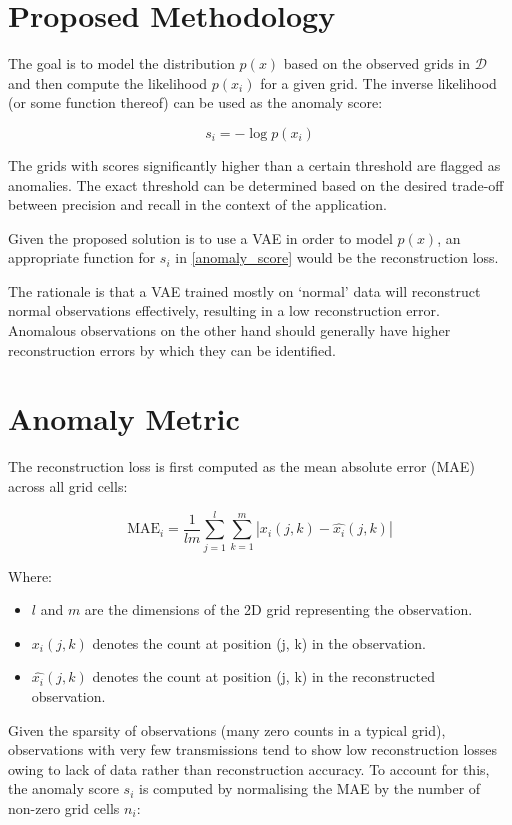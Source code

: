 \documentclass{mldsmsc}
\begin{document}
\section{Proposed Methodology}

The goal is to model the distribution $p(x)$ based on the observed grids in $\mathcal{D}$ and then compute the likelihood $p(x_i)$ for a given grid. The inverse likelihood (or some function thereof) can be used as the anomaly score:

\begin{equation}
	s_i = -\log p(x_i) \label{anomaly_score}
\end{equation}

The grids with scores significantly higher than a certain threshold are flagged as anomalies. The exact threshold can be determined based on the desired trade-off between precision and recall in the context of the application.

Given the proposed solution is to use a VAE in order to model $p(x)$, an appropriate function for $s_i$ in \ref{anomaly_score} would be the reconstruction loss.

The rationale is that a VAE trained mostly on `normal' data will reconstruct normal observations effectively, resulting in a low reconstruction error. Anomalous observations on the other hand should generally have higher reconstruction errors by which they can be identified.

\section{Anomaly Metric}

The reconstruction loss is first computed as the mean absolute error (MAE) across all grid cells:

\[
\text{MAE}_i = \frac{1}{lm} \sum_{j=1}^{l} \sum_{k=1}^{m} |x_i(j,k) - \hat{x_i}(j,k)|
\]

Where:
\begin{itemize}
	\item \( l \) and \( m \) are the dimensions of the 2D grid representing the observation.
	\item \( {x_i}(j,k) \) denotes the count at position (j, k) in the observation.
	\item \( \hat{x_i}(j,k) \) denotes the count at position (j, k) in the reconstructed observation.
\end{itemize}

Given the sparsity of observations (many zero counts in a typical grid), observations with very few transmissions tend to show low reconstruction losses owing to lack of data rather than reconstruction accuracy. To account for this, the anomaly score $s_i$ is computed by normalising the MAE by the number of non-zero grid cells $n_i$:
\end{document}

